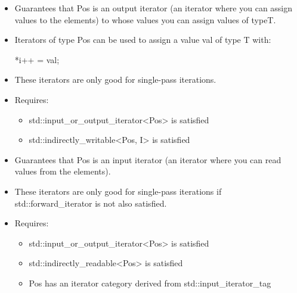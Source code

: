 
\begin{itemize}
\item
Guarantees that Pos is an output iterator (an iterator where you can assign values to the elements) to whose values you can assign values of typeT.

\item
Iterators of type Pos can be used to assign a value val of type T with:

\begin{cpp}
*i++ = val;
\end{cpp}

\item
These iterators are only good for single-pass iterations.

\item
Requires:
\begin{itemize}
\item
std::input\_or\_output\_iterator<Pos> is satisfied

\item
std::indirectly\_writable<Pos, I> is satisfied
\end{itemize}
\end{itemize}


\begin{itemize}
\item
Guarantees that Pos is an input iterator (an iterator where you can read values from the elements).

\item
These iterators are only good for single-pass iterations if std::forward\_iterator is not also satisfied.

\item
Requires:
\begin{itemize}
\item
std::input\_or\_output\_iterator<Pos> is satisfied

\item
std::indirectly\_readable<Pos> is satisfied

\item
Pos has an iterator category derived from std::input\_iterator\_tag
\end{itemize}
\end{itemize}


